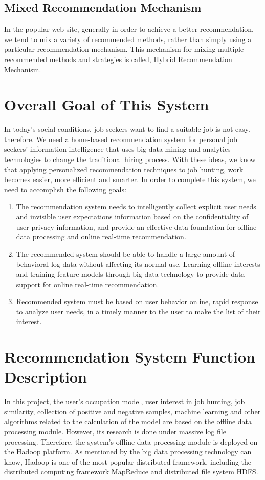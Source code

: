 \documentclass[sigconf]{acmart}
\begin{document}
\subsection{Mixed Recommendation Mechanism}
In the popular web site, generally in order to achieve a better recommendation, we tend to mix a variety of recommended methods, rather than simply using a particular recommendation mechanism.\cite{CBF2017} This mechanism for mixing multiple recommended methods and strategies is called, Hybrid Recommendation Mechanism.




\section{Overall Goal of This System}
In today's social conditions, job seekers want to find a suitable job is not easy. therefore. We need a home-based recommendation system for personal job seekers' information intelligence that uses big data mining and analytics technologies to change the traditional hiring process. With these ideas, we know that applying personalized recommendation techniques to job hunting, work becomes easier, more efficient and smarter.\cite{CBF2017} In order to complete this system, we need to accomplish the following goals:

\begin{enumerate}
  \item  The recommendation system needs to intelligently collect explicit user needs and invisible user expectations information based on the confidentiality of user privacy information, and provide an effective data foundation for offline data processing and online real-time recommendation.
  \item The recommended system should be able to handle a large amount of behavioral log data without affecting its normal use. Learning offline interests and training feature models through big data technology to provide data support for online real-time recommendation.
  \item  Recommended system must be based on user behavior online, rapid response to analyze user needs, in a timely manner to the user to make the list of their interest.

\end{enumerate}


\section{Recommendation System Function Description}
In this project, the user's occupation model, user interest in job hunting, job similarity, collection of positive and negative samples, machine learning and other algorithms related to the calculation of the model are based on the offline data processing module.\cite{CBF2017} However, its research is done under massive log file processing. Therefore, the system's offline data processing module is deployed on the Hadoop platform. As mentioned by the big data processing technology can know, Hadoop is one of the most popular distributed framework, including the distributed computing framework MapReduce and distributed file system HDFS.
\end{document}
